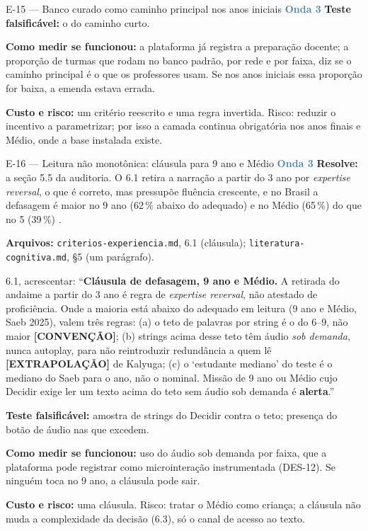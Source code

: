 \documentclass[11pt,a4paper]{article}
\newcommand{\alerta}{\textcolor{DarkYellow}{\textbf{alerta}}}
\newcommand{\onda}[1]{\textcolor{SteelBlue}{\textbf{Onda #1}}}
\newcommand{\extrap}{\textbf{[EXTRAPOLAÇÃO]}}
\newcommand{\conv}{\textbf{[CONVENÇÃO]}}
\begin{document}
\begin{emendabox}{E-15 --- Banco curado como caminho principal nos anos iniciais \hfill \onda{3}}
\textbf{Teste falsificável:} o do caminho curto.

\textbf{Como medir se funcionou:} a plataforma já registra a preparação docente; a proporção de
turmas que rodam no banco padrão, por rede e por faixa, diz se o caminho principal é o que os
professores usam. Se nos anos iniciais essa proporção for baixa, a emenda estava errada.

\textbf{Custo e risco:} um critério reescrito e uma regra invertida. Risco: reduzir o incentivo a
parametrizar; por isso a camada continua obrigatória nos anos finais e Médio, onde a base
instalada existe.
\end{emendabox}

\begin{emendabox}{E-16 --- Leitura não monotônica: cláusula para 9\textordmasculine{} ano e Médio \hfill \onda{3}}
\textbf{Resolve:} a seção 5.5 da auditoria. O 6.1 retira a narração a partir do
3\textordmasculine{} ano por \emph{expertise reversal}, o que é correto, mas pressupõe fluência
crescente, e no Brasil a defasagem é maior no 9\textordmasculine{} ano (62\,\% abaixo do adequado)
e no Médio (65\,\%) do que no 5\textordmasculine{} (39\,\%) \cite{saeb2025, pisa2022}.

\textbf{Arquivos:} \texttt{criterios-experiencia.md}, 6.1 (cláusula);
\texttt{literatura-cognitiva.md}, \S5 (um parágrafo).

\begin{depoisbox}\small
6.1, acrescentar: ``\textbf{Cláusula de defasagem, 9\textordmasculine{} ano e Médio.} A retirada
do andaime a partir do 3\textordmasculine{} ano é regra de \emph{expertise reversal}, não
atestado de proficiência. Onde a maioria está abaixo do adequado em leitura (9\textordmasculine{}
ano e Médio, Saeb 2025), valem três regras: (a) o teto de palavras por string é o do
6\textordmasculine{}--9\textordmasculine{}, não maior \conv; (b) strings acima desse teto têm áudio
\emph{sob demanda}, nunca autoplay, para não reintroduzir redundância a quem lê \extrap{} de
Kalyuga; (c) o `estudante mediano' do teste é o mediano do Saeb para o ano, não o nominal. Missão
de 9\textordmasculine{} ano ou Médio cujo Decidir exige ler um texto acima do teto sem áudio sob
demanda é \alerta.''
\end{depoisbox}

\textbf{Teste falsificável:} amostra de strings do Decidir contra o teto; presença do botão de
áudio nas que excedem.

\textbf{Como medir se funcionou:} uso do áudio sob demanda por faixa, que a plataforma pode
registrar como microinteração instrumentada (DES-12). Se ninguém toca no 9\textordmasculine{}
ano, a cláusula pode sair.

\textbf{Custo e risco:} uma cláusula. Risco: tratar o Médio como criança; a cláusula não muda a
complexidade da decisão (6.3), só o canal de acesso ao texto.
\end{emendabox}
\end{document}
